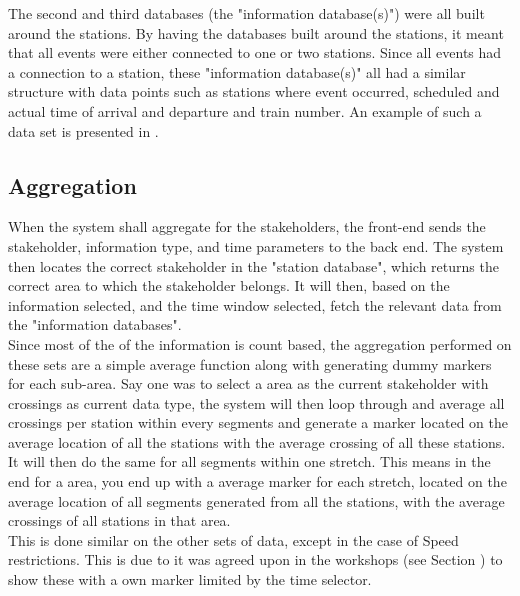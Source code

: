 The second and third databases (the "information database(s)") were all built
around the stations. By having the databases built around the stations, it 
meant that all events were either connected to one or two stations. Since all
events had a connection to a station, these "information database(s)" all had a
similar structure with data points such as stations where event occurred, 
scheduled and actual time of arrival and departure and train number. An 
example of such a data set is presented in .


\subsection{Aggregation} %
\label{sub:back_end_aggregation}
When the system shall aggregate for the stakeholders, the front-end sends
the stakeholder, information type, and time parameters to the back end. 
The system then locates the correct stakeholder in the "station database",
which returns the correct area to which the stakeholder belongs. It will
then, based on the information selected, and the time window
selected, fetch the relevant data from the "information databases". \\

Since most of the of the information is count based, the aggregation performed
on these sets are a simple average function along with generating dummy 
markers for each sub-area. Say one was to select a area as the current 
stakeholder with crossings as current data type, the system will then loop 
through and average all crossings per station within every segments and 
generate a marker located on the average location of all the stations with the 
average crossing of all these stations. It will then do the same for all 
segments within one stretch. This means in the end for a area, you end up with 
a average marker for each stretch, located on the  average location of all 
segments generated from all the stations, with the average crossings of all 
stations in that area.\\

This is done similar on the other sets of data, except in the case of Speed
restrictions. This is due to it was agreed upon in the workshops (see Section
) to show these with a own marker limited by the time
selector.


